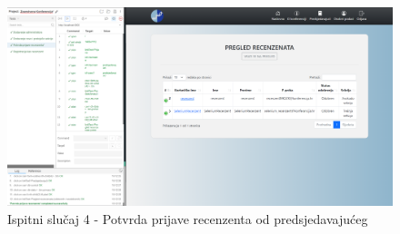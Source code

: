 			   \begin{figure}[H]
			 	\includegraphics[width= 15 cm, height= 25 cm, keepaspectratio]{slike/test_potvrda_prijave_recenzenta.png} 
			 	\centering
			 	\caption{Ispitni slučaj 4 - Potvrda prijave recenzenta od predsjedavajućeg}
			 	\label{fig:act5}
			 \end{figure}
			 
